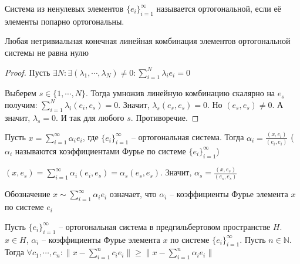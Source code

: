 \documentclass[document.tex]{subfiles}
\begin{document}
\begin{definition}
    Система из ненулевых элементов $\{e_i\}_{i = 1}^{\infty}$ называется ортогональной, если её элементы попарно ортогональны.
\end{definition}

\begin{statement}
    Любая нетривиальная конечная линейная комбинация элементов ортогональной системы не равна нулю
\end{statement}

\begin{proof}
    Пусть $\exists N : \exists (\lambda_1, \cdots, \lambda_N) \neq 0: \sum_{i = 1}^{N} \lambda_i e_i = 0$

    Выберем $s \in \{1, \cdots, N\}$. Тогда умножив линейную комбинацию скалярно на $e_s$ получим:
    $\sum_{i = 1}^{N} \lambda_i (e_i, e_s) = 0$. Значит, $\lambda_s (e_s, e_s) = 0$. Но $(e_s, e_s) \neq 0$. А значит,
    $\lambda_s = 0$. И так для любого $s$. Противоречие.
\end{proof}

\begin{theorem}
    Пусть $x = \sum_{i = 1}^{\infty} \alpha_i e_i$, где $\{e_i\}_{i = 1}^{\infty}$ -- ортогональная система.
    Тогда $\alpha_i = \frac{(x, e_i)}{(e_i, e_i)}$ ($\alpha_i$ называются коэффициентами Фурье по системе $\{e_i\}_{i =
    1}^{\infty}$)
\end{theorem}

\begin{theorem}
    $(x, e_s) = \sum_{i = 1}^{\infty} \alpha_i (e_i, e_s) = \alpha_s (e_s, e_s)$. Значит, $\alpha_s =
    \frac{(x, e_s)}{(e_s, e_s)}$
\end{theorem}

\begin{remark}
    Обозначение $x \sim \sum_{i = 1}^{\infty} \alpha_i e_i$ означает, что $\alpha_i$ -- коэффициенты Фурье элемента $x$
    по системе $e_i$
\end{remark}

\begin{theorem}
    Пусть $\{e_i\}_{i = 1}^{\infty}$ -- ортогональная система в предгильбертовом пространстве $H$. $x \in H$, $\alpha_i$
    -- коэффициенты Фурье элемента $x$ по системе $\{e_i\}_{i = 1}^{\infty}$. Пусть $n \in \mathbb{N}$. Тогда $\forall
    c_1, \cdots, c_n: \|x - \sum_{i = 1}^n c_i e_i\| \geq \|x - \sum_{i = 1}^n \alpha_i e_i\|$
\end{theorem}
\end{document}
